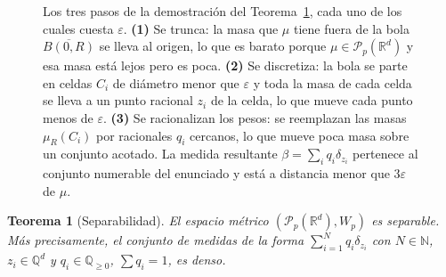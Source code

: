 \documentclass[12pt, a4paper]{amsbook}
\newcommand{\R}{{\mathbb R}}
\newcommand{\Q}{{\mathbb Q}}
\newcommand{\N}{{\mathbb N}}
\newtheorem{teo}{Teorema}[section]
\theoremstyle{remark}
\theoremstyle{definition}
\numberwithin{section}{chapter}
\numberwithin{subsection}{section}
\numberwithin{equation}{section}
\numberwithin{figure}{chapter}
\begin{document}
\begin{figure}[ht]
\caption{Los tres pasos de la demostración del Teorema~\ref{teo.Wp.separable},
cada uno de los cuales cuesta $\varepsilon$. \textbf{(1)} Se trunca: la masa
que $\mu$ tiene fuera de la bola $\overline{B(0,R)}$ se lleva al origen, lo
que es barato porque $\mu\in\mathcal P_p(\R^d)$ y esa masa está lejos pero es
poca. \textbf{(2)} Se discretiza: la bola se parte en celdas $C_i$ de diámetro
menor que $\varepsilon$ y toda la masa de cada celda se lleva a un punto
racional $z_i$ de la celda, lo que mueve cada punto menos de $\varepsilon$.
\textbf{(3)} Se racionalizan los pesos: se reemplazan las masas $\mu_R(C_i)$
por racionales $q_i$ cercanos, lo que mueve poca masa sobre un conjunto
acotado. La medida resultante $\beta=\sum_iq_i\delta_{z_i}$ pertenece al
conjunto numerable del enunciado y está a distancia menor que $3\varepsilon$
de $\mu$.}
\label{fig.separabilidad}
\end{figure}

\begin{teo}[Separabilidad]\label{teo.Wp.separable}
El espacio métrico $(\mathcal P_p(\R^d),W_p)$ es separable. Más precisamente,
el conjunto de medidas de la forma $\sum_{i=1}^Nq_i\delta_{z_i}$ con $N\in\N$,
$z_i\in\Q^d$ y $q_i\in\Q_{\ge0}$, $\sum q_i=1$, es denso.
\end{teo}
\end{document}
